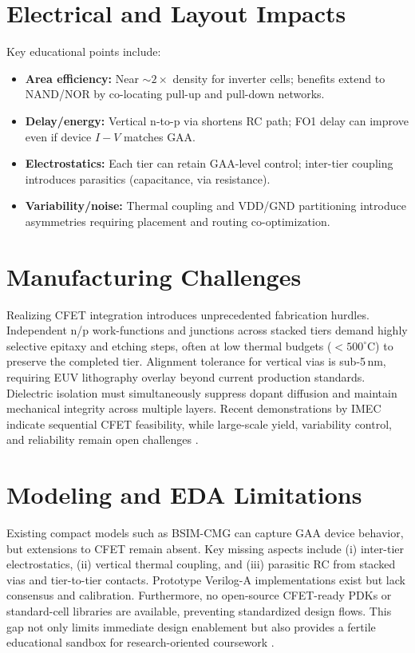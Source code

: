 \documentclass[conference]{IEEEtran}
\begin{document}
\section{Electrical and Layout Impacts}
Key educational points include:
\begin{itemize}
  \item \textbf{Area efficiency:} Near $\sim 2\times$ density for inverter cells; benefits extend to NAND/NOR by co-locating pull-up and pull-down networks.
  \item \textbf{Delay/energy:} Vertical n-to-p via shortens RC path; FO1 delay can improve even if device $I\!-\!V$ matches GAA.
  \item \textbf{Electrostatics:} Each tier can retain GAA-level control; inter-tier coupling introduces parasitics (capacitance, via resistance).
  \item \textbf{Variability/noise:} Thermal coupling and VDD/GND partitioning introduce asymmetries requiring placement and routing co-optimization.
\end{itemize}

\section{Manufacturing Challenges}
Realizing CFET integration introduces unprecedented fabrication hurdles.
Independent n/p work-functions and junctions across stacked tiers demand highly selective epitaxy and etching steps, often at low thermal budgets ($<500^{\circ}$C) to preserve the completed tier.
Alignment tolerance for vertical vias is sub-5\,nm, requiring EUV lithography overlay beyond current production standards.
Dielectric isolation must simultaneously suppress dopant diffusion and maintain mechanical integrity across multiple layers.
Recent demonstrations by IMEC indicate sequential CFET feasibility, while large-scale yield, variability control, and reliability remain open challenges \cite{imec_cfet_iedm2020}.

\section{Modeling and EDA Limitations}
Existing compact models such as BSIM-CMG can capture GAA device behavior, but extensions to CFET remain absent.
Key missing aspects include (i) inter-tier electrostatics, (ii) vertical thermal coupling, and (iii) parasitic RC from stacked vias and tier-to-tier contacts.
Prototype Verilog-A implementations exist but lack consensus and calibration.
Furthermore, no open-source CFET-ready PDKs or standard-cell libraries are available, preventing standardized design flows.
This gap not only limits immediate design enablement but also provides a fertile educational sandbox for research-oriented coursework \cite{bsimcmg_sispad2017}.
\end{document}
